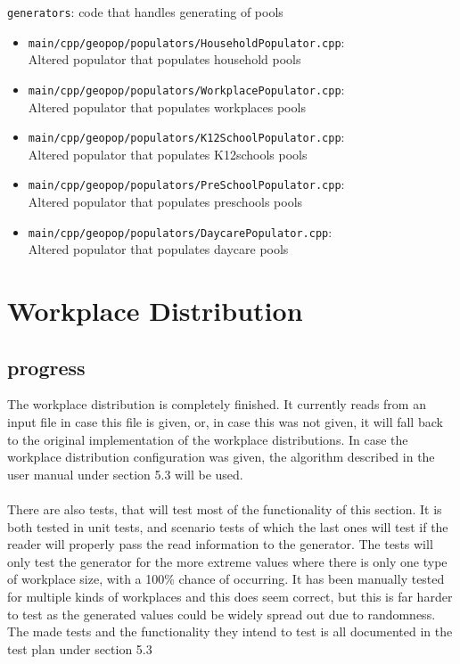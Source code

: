 \documentclass[runningheads]{llncs}
\begin{document}
	\texttt{generators}: code that handles generating of pools
	\begin{itemize}
		\item \texttt{main/cpp/geopop/populators/HouseholdPopulator.cpp}:\\
		Altered populator that populates household pools
		\item \texttt{main/cpp/geopop/populators/WorkplacePopulator.cpp}:\\
		Altered populator that populates workplaces pools
		\item \texttt{main/cpp/geopop/populators/K12SchoolPopulator.cpp}:\\
		Altered populator that populates K12schools pools
		\item \texttt{main/cpp/geopop/populators/PreSchoolPopulator.cpp}:\\
		Altered populator that populates preschools pools
		\item \texttt{main/cpp/geopop/populators/DaycarePopulator.cpp}:\\
		Altered populator that populates daycare pools
	\end{itemize}
	
	\section{Workplace Distribution}
	\subsection{progress}
	The workplace distribution is completely finished. It currently reads from an input file in case this file is given, or, in case this was not given, it will fall back to the original implementation of the workplace distributions. In case the workplace distribution configuration was given, the algorithm described in the user manual under section 5.3 will be used. \\
	\\
	There are also tests, that will test most of the functionality of this section. It is both tested in unit tests, and scenario tests of which the last ones will test if the reader will properly pass the read information to the generator. The tests will only test the generator for the more extreme values where there is only one type of workplace size, with a 100\% chance of occurring. It has been manually tested for multiple kinds of workplaces and this does seem correct, but this is far harder to test as the generated values could be widely spread out due to randomness. The made tests and the functionality they intend to test is all documented in the test plan under section 5.3
	
\end{document}
